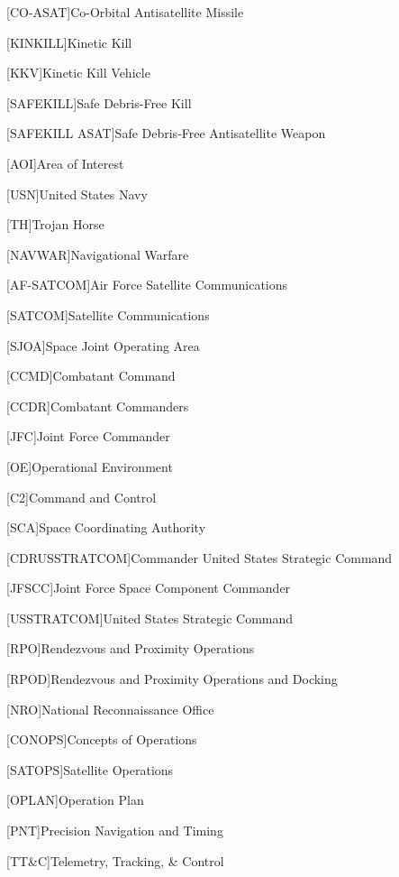 [CO-ASAT]{Co-Orbital Antisatellite Missile}

[KINKILL]{Kinetic Kill}

[KKV]{Kinetic Kill Vehicle}

[SAFEKILL]{Safe Debris-Free Kill}

[SAFEKILL ASAT]{Safe Debris-Free Antisatellite Weapon}

[AOI]{Area of Interest}

[USN]{United States Navy}

[TH]{Trojan Horse}

[NAVWAR]{Navigational Warfare}

[AF-SATCOM]{Air Force Satellite Communications}

[SATCOM]{Satellite Communications}

[SJOA]{Space Joint Operating Area}

[CCMD]{Combatant Command}

[CCDR]{Combatant Commanders}

[JFC]{Joint Force Commander}

[OE]{Operational Environment}

[C2]{Command and Control}

[SCA]{Space Coordinating Authority}

[CDRUSSTRATCOM]{Commander United States Strategic Command}

[JFSCC]{Joint Force Space Component Commander}

[USSTRATCOM]{United States Strategic Command}

[RPO]{Rendezvous and Proximity Operations}

[RPOD]{Rendezvous and Proximity Operations and Docking}

[NRO]{National Reconnaissance Office}

[CONOPS]{Concepts of Operations}

[SATOPS]{Satellite Operations}

[OPLAN]{Operation Plan}

[PNT]{Precision Navigation and Timing}

[TT\&C]{Telemetry, Tracking, \& Control}

